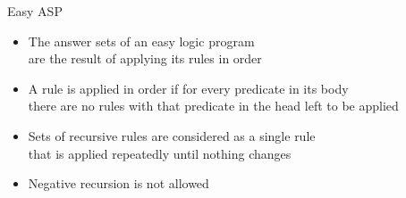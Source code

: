 \begin{frame}{Easy ASP}
\vfill
\begin{itemize}
\item
The answer sets of an easy logic program \\ are the result of applying its rules in order
\bigskip
\item
A rule is applied in order if for every predicate in its body \\
there are no rules with that predicate in the head left to be applied
\bigskip
\item
Sets of recursive rules are considered as a single rule \\
that is applied repeatedly until nothing changes
\bigskip
\item 
Negative recursion is not allowed
\end{itemize}
\vfill
\end{frame}

